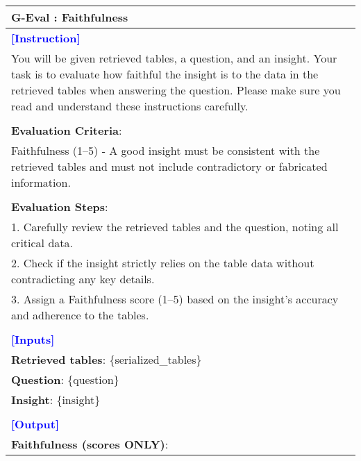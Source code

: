\begin{table*}[htbp]
\centering
\begin{tabularx}{\textwidth}{X}
\toprule

\textbf{G-Eval : Faithfulness} \\ \midrule
\textcolor{blue}{\textbf{[Instruction]}} \\
You will be given retrieved tables, a question, and an insight. Your task is to evaluate how faithful the insight is to the data in the retrieved tables when answering the question. Please make sure you read and understand these instructions carefully. \\\\
\textbf{Evaluation Criteria}: \\
Faithfulness (1–5) - A good insight must be consistent with the retrieved tables and must not include contradictory or fabricated information. \\\\
\textbf{Evaluation Steps}: \\
1. Carefully review the retrieved tables and the question, noting all critical data. \\
2. Check if the insight strictly relies on the table data without contradicting any key details. \\
3. Assign a Faithfulness score (1–5) based on the insight’s accuracy and adherence to the tables. \\\\
\textcolor{blue}{\textbf{[Inputs]}} \\
\textbf{Retrieved tables}: \{serialized\_tables\} \\
\textbf{Question}: \{question\} \\
\textbf{Insight}: \{insight\} \\\\
\textcolor{blue}{\textbf{[Output]}} \\
\textbf{Faithfulness (scores ONLY)}: \\

\midrule


\end{tabularx}
\end{table*}
